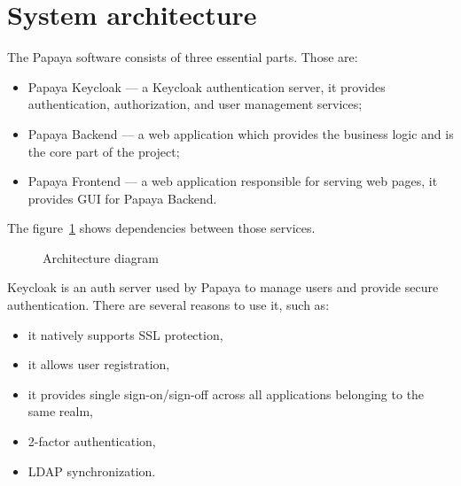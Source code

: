\section{System architecture}\label{sec:system-architecture}

The Papaya software consists of three essential parts.
Those are:
\begin{itemize}
    \item Papaya Keycloak --- a Keycloak authentication server, it provides
    authentication, authorization, and user management services;
    \item Papaya Backend --- a web application which provides the
    business logic and is the core part of the project;
    \item Papaya Frontend --- a web application responsible for serving web
    pages, it provides GUI for Papaya Backend.
\end{itemize}
The figure~\ref{fig:architecture-diagram} shows dependencies between those
services.

\begin{figure}[!h]
    \centering
    
    \caption{Architecture diagram}
    \label{fig:architecture-diagram}
\end{figure}

Keycloak is an auth server used by Papaya to manage users and
provide secure authentication.
There are several reasons to use it, such as:
\begin{itemize}
    \setlength\itemsep{0.1em}
    \item it natively supports SSL protection,
    \item it allows user registration,
    \item it provides single sign-on/sign-off across all
    applications belonging to the same realm,
    \item 2-factor authentication,
    \item LDAP synchronization.
\end{itemize}
